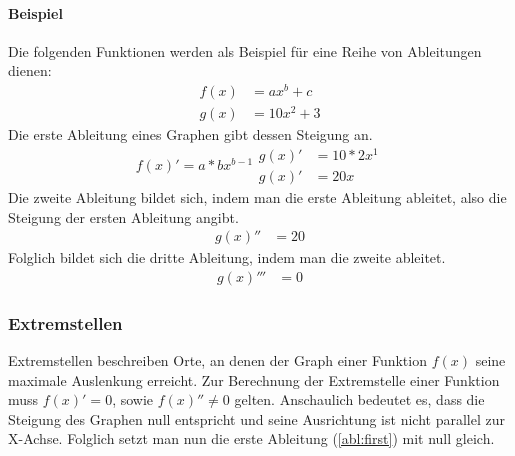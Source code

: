 \documentclass[a4paper]{article}
\begin{document}
			\paragraph{Beispiel}
				Die folgenden Funktionen werden als Beispiel für eine Reihe von Ableitungen dienen:
				\begin{equation}
					\begin{split}
						f(x) &= ax^b + c\\
						g(x) &= 10x^2 + 3\label{abl:origin}
					\end{split}
				\end{equation}
				\noindent
				Die erste Ableitung eines Graphen gibt dessen Steigung an.
				\begin{subequations}
					\begin{equation}
						f(x)' = a * bx^{b-1}
					\end{equation}
					\begin{equation}
						\begin{split}
							g(x)' &= 10*2x^1\\
							g(x)' &= 20x\label{abl:first}
						\end{split}
					\end{equation}
				\end{subequations}
				\noindent
				Die zweite Ableitung bildet sich, indem man die erste Ableitung ableitet, also die Steigung der ersten Ableitung angibt.
				\begin{equation}
					\begin{split}
						g(x)'' &= 20\label{abl:second}
					\end{split}
				\end{equation}
				\noindent
				Folglich bildet sich die dritte Ableitung, indem man die zweite ableitet.
				\begin{equation}
					\begin{split}
						g(x)''' &= 0
					\end{split}
				\end{equation}
				
			\subsubsection{Extremstellen}
				Extremstellen beschreiben Orte, an denen der Graph einer Funktion $f(x)$ seine maximale Auslenkung erreicht. Zur Berechnung der Extremstelle einer Funktion muss $f(x)' = 0$, sowie $f(x)'' \neq 0$ gelten. Anschaulich bedeutet es, dass die Steigung des Graphen null entspricht und seine Ausrichtung ist nicht parallel zur X-Achse.
				Folglich setzt man nun die erste Ableitung (\ref{abl:first}) mit null gleich.
				
\end{document}
